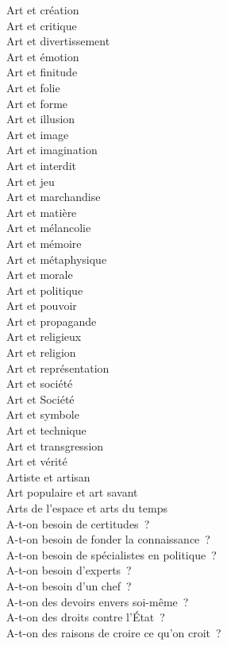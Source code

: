 \documentclass[a4paper,12pt]{article}
\begin{document}
Art et création \\
Art et critique \\
Art et divertissement \\
Art et émotion \\
Art et finitude \\
Art et folie \\
Art et forme \\
Art et illusion \\
Art et image \\
Art et imagination \\
Art et interdit \\
Art et jeu \\
Art et marchandise \\
Art et matière \\
Art et mélancolie \\
Art et mémoire \\
Art et métaphysique \\
Art et morale \\
Art et politique \\
Art et pouvoir \\
Art et propagande \\
Art et religieux \\
Art et religion \\
Art et représentation \\
Art et société \\
Art et Société \\
Art et symbole \\
Art et technique \\
Art et transgression \\
Art et vérité \\
Artiste et artisan \\
Art populaire et art savant \\
Arts de l'espace et arts du temps \\
A-t-on besoin de certitudes ? \\
A-t-on besoin de fonder la connaissance ? \\
A-t-on besoin de spécialistes en politique ? \\
A-t-on besoin d'experts ? \\
A-t-on besoin d'un chef ? \\
A-t-on des devoirs envers soi-même ? \\
A-t-on des droits contre l'État ? \\
A-t-on des raisons de croire ce qu'on croit ? \\
\end{document}
